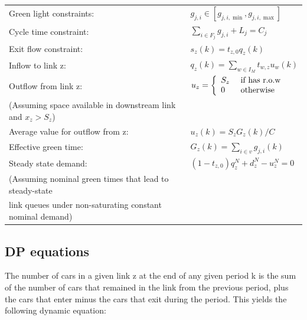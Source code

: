 \documentclass[11pt]{article}
\begin{document}
\begin{tabular}{ l l }
Green light constraints: & $g_{j,i} \in \left[g_{j, i, \min }, g_{j, i, \max }\right]$ \\
Cycle time constraint: & $\sum_{i \in F_{j}} g_{j, i}+L_{j}=C_j$ \\
Exit flow constraint: & $s_{z}(k)=t_{z, 0} q_{z}(k)$ \\
Inflow to link z: & $q_{z}(k)= \sum_{w \in I_{M}} t_{w, z} u_{w}(k)$ \\
Outflow from link z: & $u_z = \left\{ \begin{array} { l l } { S_z } & { \text { if  has r.o.w}  } \\ { 0 } & { \text { otherwise} } \end{array} \right.$ \\
(Assuming space available in downstream link and $x_z>S_z$)\\
Average value for outflow from z: & $u_{z}(k)=S_{z} G_{z}(k) / C$\\
Effective green time: & $G_{z}(k)=\sum_{i \in v} g_{j, i}(k)$ \\
Steady state demand: & $\left(1-t_{z, 0}\right) q_{z}^{N}+d_{z}^{N}-u_{z}^{N}=0$ \\
(Assuming nominal green times that lead to steady-state \\
link queues under non-saturating constant nominal demand) \\
\end{tabular}


\subsection{DP equations}
The number of cars in a given link z at the end of any given period k is the sum of the number of cars that remained in the link from the previous period, plus the cars that enter minus the cars that exit during the period. This yields the following dynamic equation:
\end{document}
